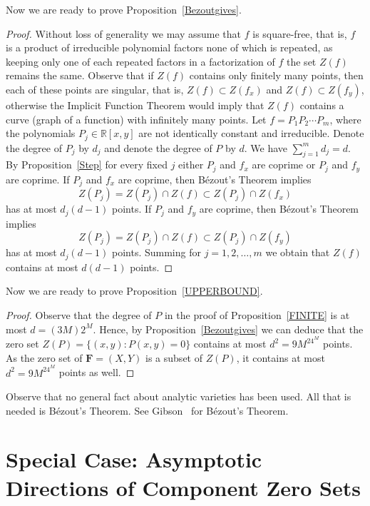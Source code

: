 \documentclass{article}
\theoremstyle{remark}
\numberwithin{equation}{section}
\begin{document}
\noindent Now we are ready to prove Proposition~\ref{Bezoutgives}.

\begin{proof} Without loss of generality we may assume that $f$ is square-free, that is, $f$ is a product of irreducible polynomial factors none of which is repeated,
as keeping only one of each repeated factors in a factorization of $f$ the set $Z(f)$ remains the same.
Observe that if $Z(f)$ contains only finitely many points, then each of these points are singular, that is, $Z(f) \subset Z(f_x)$ and $Z(f) \subset Z(f_y)$,
otherwise the Implicit Function Theorem would imply that $Z(f)$ contains a curve (graph of a function) with infinitely many points. Let 
$f = P_1P_2 \cdots P_m$, where the polynomials $P_j \in {\mathbb R}[x,y]$ are not identically constant and irreducible. Denote the degree of 
$P_j$ by $d_j$ and denote the degree of $P$ by $d$. We have $\sum_{j=1}^m{d_j} = d$. By Proposition~\ref{Step} for every fixed $j$ either 
$P_j$ and $f_x$ are coprime or $P_j$ and $f_y$ are coprime. If $P_j$ and $f_x$ are coprime, then B\'ezout's Theorem implies
$$Z(P_j) = Z(P_j) \cap Z(f) \subset Z(P_j) \cap Z(f_x)$$ has at most $d_j(d-1)$ points. If $P_j$ and $f_y$ are coprime, then B\'ezout's Theorem implies
$$Z(P_j) = Z(P_j) \cap Z(f) \subset Z(P_j) \cap Z(f_y)$$ has at most $d_j(d-1)$ points. Summing for $j = 1,2,\ldots,m$ we obtain that
$Z(f)$ contains at most $d(d-1)$ points.
\end{proof}

\noindent Now we are ready to prove Proposition~\ref{UPPERBOUND}.

\begin{proof} Observe that the degree of $P$ in the proof of Proposition~\ref{FINITE} is at most $d = (3M)2^M$. Hence, by Proposition~\ref{Bezoutgives} we can deduce that 
the zero set $Z(P) = \{(x,y): P(x,y) = 0\}$ contains at most $d^2 = 9M^24^M$ points. As the zero set of ${\mathbf F}=(X,Y)$ is a subset of $Z(P)$, 
it contains at most $d^2 = 9M^24^M$ points as well.
\end{proof}

Observe that no general fact about analytic varieties has been used. All that is needed is B\'ezout's Theorem. See Gibson~\cite{Gibson} for B\'ezout's Theorem.

\section{Special Case: Asymptotic Directions of Component Zero Sets}\label{Asymptotes}
\end{document}
